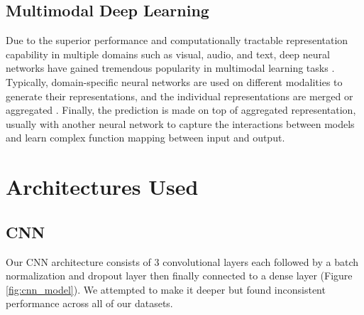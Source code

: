 \documentclass{turabian-thesis}
\begin{document}
\subsection{Multimodal Deep Learning}

Due to the superior performance and computationally tractable representation capability in multiple domains such as visual, audio, and text, deep neural networks have gained tremendous popularity in multimodal learning tasks \cite{kim_multimodal_2018}. Typically, domain-specific neural networks are used on different modalities to generate their representations, and the individual representations are merged or aggregated \cite{liu_learn_2018}. Finally, the prediction is made on top of aggregated representation, usually with another neural network to capture the interactions between models and learn complex function mapping between input and output.


\section{Architectures Used}

\subsection{CNN}

Our CNN architecture consists of 3 convolutional layers each followed by a batch normalization and dropout layer then finally connected to a dense layer (Figure \ref{fig:cnn_model}). We attempted to make it deeper but found inconsistent performance across all of our datasets.
\end{document}
